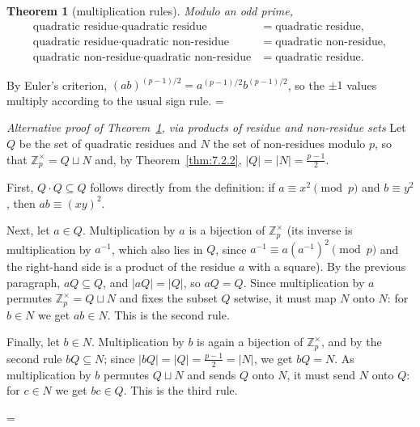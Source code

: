 \documentclass[11pt]{article}
\makeatletter
\let\nt@closedisplay\]
\def\nt@guardedclose{\@ifnextchar\par{\nt@closeafterpar}{\@ifnextchar\end{\postdisplaypenalty\@M\nt@closedisplay}{\nt@closedisplay}}}
\def\nt@closeafterpar\par{\@ifnextchar\par{\nt@closeafterpar}{\@ifnextchar\end{\postdisplaypenalty\@M\nt@closedisplay\par}{\nt@closedisplay\par}}}
\renewenvironment{proof}[1][\proofname]{\par
  \pushQED{\qed}\normalfont\topsep\medskipamount\edef\nt@afterproof{\@endparpenalty=\the\@endparpenalty\relax}\@beginparpenalty\@M\@endparpenalty\@M\let\]\nt@guardedclose\trivlist\item[]\textit{#1\@addpunct{.}} \ignorespaces}{\ifvmode\addpenalty\@M\fi\popQED\nt@afterproof\endtrivlist\@endpefalse}
\theoremstyle{ntstyle}
\newtheorem{theorem}{Theorem}[subsection]
\newenvironment{altproof}[1][\proofname]
  {\begin{proof}[#1]\renewcommand{\qedsymbol}{}}{\end{proof}}
\newcommand{\ZmodUnits}[1]{\mathbb{Z}_{#1}^{\times}}
\makeatother
\begin{document}
\begin{theorem}[multiplication rules]\label{thm:7.2.3}\label{thm:multiplication-rules}
  Modulo an
  odd prime,
  \[
    \begin{aligned}
      \text{quadratic residue} \cdot \text{quadratic residue}         & = \text{quadratic residue},     \\
      \text{quadratic residue} \cdot \text{quadratic non-residue}     & = \text{quadratic non-residue}, \\
      \text{quadratic non-residue} \cdot \text{quadratic non-residue} & = \text{quadratic residue}.
    \end{aligned}
  \]

\end{theorem}

\begin{proof} By Euler's criterion, $(ab)^{(p-1)/2} = a^{(p-1)/2} b^{(p-1)/2}$, so the $\pm 1$ values multiply according to the usual sign rule.
\end{proof}

\begin{altproof}[Alternative proof of Theorem~\ref{thm:7.2.3}, via products of residue and non-residue sets] Let
  $Q$ be the set of quadratic residues and $N$ the set of non-residues
  modulo $p$, so that $\ZmodUnits{p} = Q \sqcup N$ and, by
  Theorem~\ref{thm:7.2.2}, $|Q| = |N| = \tfrac{p-1}{2}$.

  First, $Q \cdot Q \subseteq Q$ follows directly from the definition: if $a \equiv x^{2} \pmod{p}$ and
  $b \equiv y^{2}$, then $ab \equiv (xy)^{2}$.

  Next, let $a \in Q$. Multiplication by $a$ is a bijection of
  $\ZmodUnits{p}$ (its inverse is multiplication by $a^{-1}$,
  which also lies in $Q$, since $a^{-1} \equiv a(a^{-1})^{2} \pmod{p}$ and the right-hand side is a
    product of the residue $a$ with a square). By the previous paragraph,
  $aQ \subseteq Q$, and $|aQ| = |Q|$, so $aQ = Q$. Since multiplication
    by $a$ permutes $\ZmodUnits{p} = Q \sqcup N$ and fixes the
    subset $Q$ setwise, it must map $N$ onto $N$: for $b \in N$ we get $ab \in N$. This is the second rule.

    Finally, let $b \in N$. Multiplication by $b$ is again a bijection of
  $\ZmodUnits{p}$, and by the second rule $bQ \subseteq N$;
    since $|bQ| = |Q| = \tfrac{p-1}{2} = |N|$, we get $bQ = N$. As
    multiplication by $b$ permutes $Q \sqcup N$ and sends $Q$ onto $N$, it
    must send $N$ onto $Q$: for $c \in N$ we get $bc \in Q$. This is the
  third rule.

\end{altproof}
\end{document}
